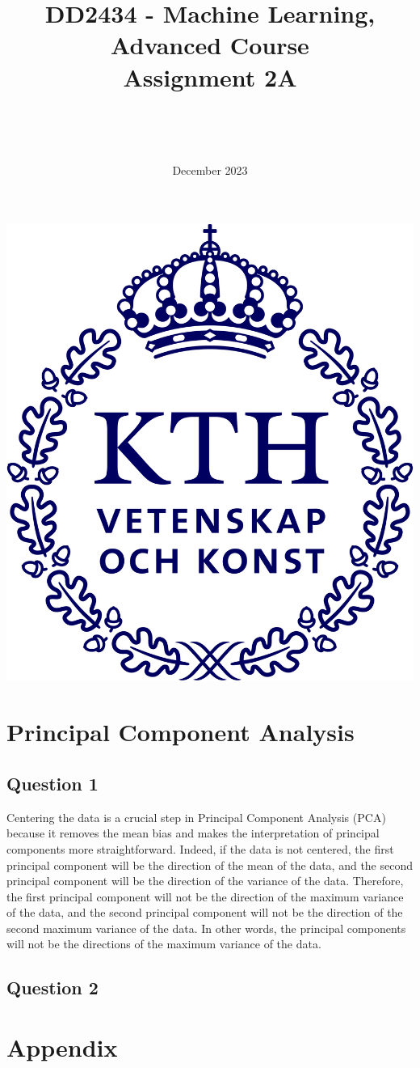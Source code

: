 \documentclass{article}
\title{DD2434 - Machine Learning, Advanced Course \\ Assignment 2A}
\author{\authorFst \\ \emailFst \and \authorSnd \\ \emailSnd}
\date{December 2023}
\begin{document}
\maketitle

\begin{center}
    \includegraphics[scale=0.5]{KTH_logo_RGB_bla.png}
\end{center}

\thispagestyle{empty}

\newpage
\tableofcontents
\newpage

\section{Principal Component Analysis}

\subsection{Question 1}

Centering the data is a crucial step in Principal Component Analysis (PCA) because it removes the mean bias and makes the interpretation of principal components more straightforward. Indeed, if the data is not centered, the first principal component will be the direction of the mean of the data, and the second principal component will be the direction of the variance of the data. Therefore, the first principal component will not be the direction of the maximum variance of the data, and the second principal component will not be the direction of the second maximum variance of the data. In other words, the principal components will not be the directions of the maximum variance of the data.

\subsection{Question 2}

\newpage
\appendix
\section{Appendix}
\end{document}
